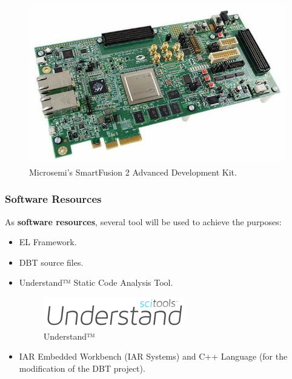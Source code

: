 \documentclass[12pt]{article}
\begin{document}
{\begin{figure}[!htb]
\centering
\includegraphics[scale=0.2]{images/SmartFusion2.jpg}
\caption{Microsemi's SmartFusion\textsuperscript{\textregistered} 2 Advanced Development Kit.}
\label{fig:SmartFusion} 
\end{figure}


\subsubsection{Software Resources}
As \textbf{software resources}, several tool will be used to achieve the purposes: 
\begin{itemize}
\item EL Framework.
\item DBT source files.
\end{itemize}


\begin{itemize}
\item Understand™ Static Code Analysis Tool.

\begin{figure}[!htb]
\centering
\includegraphics[scale=0.5]{images/Understand_logo}
\caption{Understand™}
\label{fig:Understand_logo} 
\end{figure}

\item IAR Embedded Workbench (IAR Systems) and C++ Language (for the modification of the DBT project).


\end{itemize}}
\end{document}
